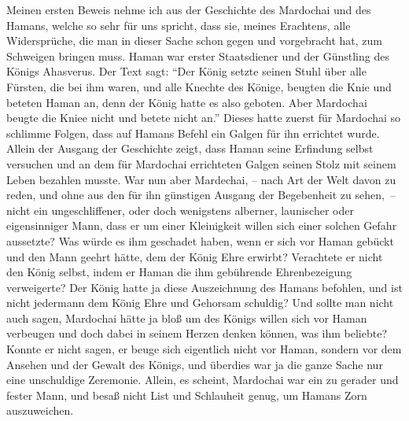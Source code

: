 Meinen ersten Beweis nehme ich aus der Geschichte des
Mardochai und des Hamans,
welche so sehr für uns spricht, dass sie, meines Erachtens, alle Widersprüche,
die man in dieser Sache schon gegen und vorgebracht hat, zum Schweigen bringen
muss. Haman war erster Staatsdiener und der Günstling des Königs Ahasverus. Der
Text sagt:
"`Der König setzte seinen Stuhl über alle Fürsten, die bei ihm waren,
und alle Knechte des Könige, beugten die Knie und beteten Haman an, denn der
König hatte es also geboten. Aber Mardochai beugte die Kniee nicht und betete
nicht an."'
Dieses hatte zuerst für Mardochai so
schlimme Folgen, dass auf Hamans Befehl ein Galgen für ihn errichtet wurde.
Allein
der Ausgang der Geschichte zeigt, dass Haman seine Erfindung selbst versuchen
und an dem für Mardochai errichteten Galgen seinen Stolz mit seinem Leben
bezahlen musste. War nun aber Mardechai, -- nach Art der Welt davon zu reden,
und
ohne aus den für ihn günstigen Ausgang der Begebenheit zu sehen,~-- nicht ein
ungeschliffener, oder doch wenigstens alberner, launischer oder eigensinniger
Mann, dass er um einer Kleinigkeit willen sich einer solchen Gefahr aussetzte?
Was würde es ihm geschadet haben, wenn er sich vor
Haman gebückt und den Mann geehrt hätte, dem der König Ehre erwirbt? Verachtete
er nicht den König selbst, indem er Haman die ihm gebührende Ehrenbezeigung
verweigerte? Der König hatte ja diese Auszeichnung des Hamans befohlen, und ist
nicht jedermann dem König Ehre und Gehorsam schuldig? Und sollte man nicht auch
sagen, Mardochai hätte ja bloß um des Königs willen sich vor Haman verbeugen und
doch dabei in seinem Herzen denken können, was ihm beliebte? Konnte er nicht
sagen, er beuge sich eigentlich nicht vor Haman, sondern vor dem Ansehen und der
Gewalt des Königs, und überdies war ja die ganze Sache nur eine unschuldige
Zeremonie. Allein, es scheint, Mardochai war ein zu gerader und fester Mann, und
besaß nicht List und Schlauheit genug, um Hamans Zorn auszuweichen.

